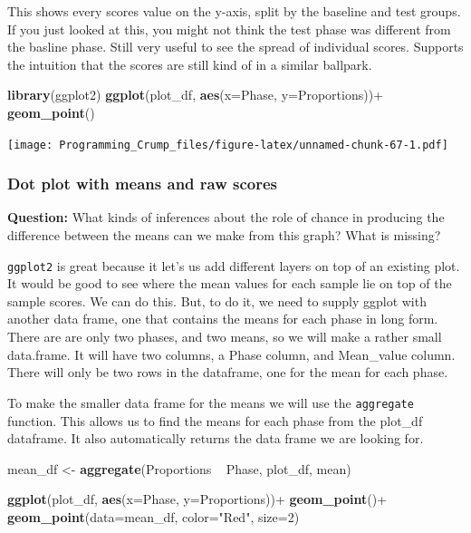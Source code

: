 \documentclass[]{book}
\newenvironment{Shaded}{\begin{snugshade}}{\end{snugshade}}
\newcommand{\KeywordTok}[1]{\textcolor[rgb]{0.13,0.29,0.53}{\textbf{{#1}}}}
\newcommand{\DataTypeTok}[1]{\textcolor[rgb]{0.13,0.29,0.53}{{#1}}}
\newcommand{\DecValTok}[1]{\textcolor[rgb]{0.00,0.00,0.81}{{#1}}}
\newcommand{\StringTok}[1]{\textcolor[rgb]{0.31,0.60,0.02}{{#1}}}
\newcommand{\NormalTok}[1]{{#1}}
\theoremstyle{definition}
\theoremstyle{definition}
\theoremstyle{definition}
\theoremstyle{remark}
\begin{document}
This shows every scores value on the y-axis, split by the baseline and
test groups. If you just looked at this, you might not think the test
phase was different from the basline phase. Still very useful to see the
spread of individual scores. Supports the intuition that the scores are
still kind of in a similar ballpark.

\begin{Shaded}
\begin{Highlighting}[]
\KeywordTok{library}\NormalTok{(ggplot2)}
\KeywordTok{ggplot}\NormalTok{(plot_df, }\KeywordTok{aes}\NormalTok{(}\DataTypeTok{x=}\NormalTok{Phase, }\DataTypeTok{y=}\NormalTok{Proportions))+}
\StringTok{  }\KeywordTok{geom_point}\NormalTok{()}
\end{Highlighting}
\end{Shaded}

\texttt{[image: Programming\_Crump\_files/figure-latex/unnamed-chunk-67-1.pdf]}

\subsubsection{Dot plot with means and raw
scores}\label{dot-plot-with-means-and-raw-scores}

\textbf{Question:} What kinds of inferences about the role of chance in
producing the difference between the means can we make from this graph?
What is missing?

\texttt{ggplot2} is great because it let's us add different layers on
top of an existing plot. It would be good to see where the mean values
for each sample lie on top of the sample scores. We can do this. But, to
do it, we need to supply ggplot with another data frame, one that
contains the means for each phase in long form. There are are only two
phases, and two means, so we will make a rather small data.frame. It
will have two columns, a Phase column, and Mean\_value column. There
will only be two rows in the dataframe, one for the mean for each phase.

To make the smaller data frame for the means we will use the
\texttt{aggregate} function. This allows us to find the means for each
phase from the plot\_df dataframe. It also automatically returns the
data frame we are looking for.

\begin{Shaded}
\begin{Highlighting}[]
\NormalTok{mean_df <-}\StringTok{ }\KeywordTok{aggregate}\NormalTok{(Proportions ~}\StringTok{ }\NormalTok{Phase, plot_df, mean)}

\KeywordTok{ggplot}\NormalTok{(plot_df, }\KeywordTok{aes}\NormalTok{(}\DataTypeTok{x=}\NormalTok{Phase, }\DataTypeTok{y=}\NormalTok{Proportions))+}\StringTok{ }
\StringTok{  }\KeywordTok{geom_point}\NormalTok{()+}
\StringTok{  }\KeywordTok{geom_point}\NormalTok{(}\DataTypeTok{data=}\NormalTok{mean_df, }\DataTypeTok{color=}\StringTok{"Red"}\NormalTok{, }\DataTypeTok{size=}\DecValTok{2}\NormalTok{)}
\end{Highlighting}
\end{Shaded}
\end{document}

